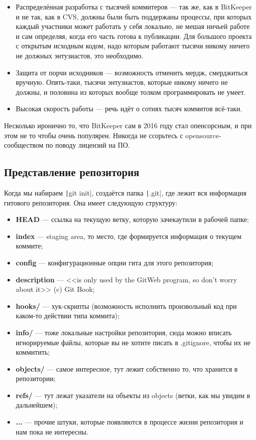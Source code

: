 \documentclass[a5paper]{article}
\begin{document}
\begin{itemize}
    \item Распределённая разработка с тысячей коммитеров --- так же, как в BitKeeper и не так, как в CVS, должны были быть поддержаны процессы, при которых каждый участники может работать у себя локально, не мешая ничьей работе и сам определяя, когда его часть готова к публикации. Для большого проекта с открытым исходным кодом, надо которым работают тысячи никому ничего не должных энтузиастов, это необходимо.
    \item Защита от порчи исходников --- возможность отменить мердж, смерджиться вручную. Опять-таки, тысячи энтузиастов, которые никому ничего не должны, и половина из которых вообще толком программировать не умеет.
    \item Высокая скорость работы --- речь идёт о сотнях тысяч коммитов всё-таки.
\end{itemize}

Несколько иронично то, что BitKeeper сам в 2016 году стал опенсорсным, и при этом не то чтобы очень популярен. Никогда не ссорьтесь с opensource-сообществом по поводу лицензий на ПО.

\subsection{Представление репозитория}

Когда мы набираем \texttt|git init|, создаётся папка \texttt|.git|, где лежит вся информация гитового репозитория. Она имеет следующую структуру:

\begin{itemize}
    \item \textbf{HEAD} --- ссылка на текущую ветку, которую зачекаутили в рабочей папке;
    \item \textbf{index} --- staging area, то место, где формируется информация о текущем коммите;
    \item \textbf{config} --- конфигурационные опции гита для этого репозитория;
    \item \textbf{description} --- <<is only used by the GitWeb program, so don’t worry about it>> (c) Git Book;
    \item \textbf{hooks/} --- хук-скрипты (возможность исполнить произвольный код при каком-то действии типа коммита);
    \item \textbf{info/} --- тоже локальные настройки репозитория, сюда можно вписать игнорируемые файлы, которые вы не хотите писать в .gitignore, чтобы их не коммитить;
    \item \textbf{objects/} --- самое интересное, тут лежит собственно то, что хранится в репозитории;
    \item \textbf{refs/} --- тут лежат указатели на объекты из objects (ветки, как мы увидим в дальнейшем);
    \item \textbf{...} --- прочие штуки, которые появляются в процессе жизни репозитория и нам пока не интересны.
\end{itemize}
\end{document}
